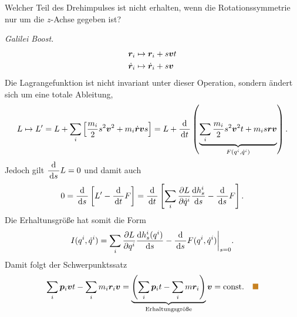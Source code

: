 \begin{bemn}[Übungsaufgabe:]
Welcher Teil des Drehimpulses ist nicht erhalten, wenn die
Rotationssymmetrie nur um die $z$-Achse gegeben ist?
\end{bemn}
\begin{bsp}
\textit{Galilei Boost.}
\begin{align*}
&\bm{r}_i \mapsto \bm{r}_i + s\bm{v}t\\
&\dot{\bm{r}}_i \mapsto \dot{\bm{r}}_i + s\bm{v}
\end{align*}
Die Lagrangefunktion ist nicht invariant unter dieser Operation, sondern ändert
sich um eine totale Ableitung,
\begin{align*}
L\mapsto L'=L + \sum_i\left[\frac{m_i}{2}s^2\bm{v}^2 + m_i\dot{\bm{r}} \bm{v}s
\right]= L + \frac{\mathrm{d}}{\,\mathrm{d} t\,}
\left(\underbrace{\sum_i \frac{m_i}{2}s^2\bm{v}^2t + m_i
s\bm{r}\bm{v}}_{F(q^i,\dot{q}^i)}\right).
\end{align*}
Jedoch gilt $\dfrac{\mathrm{d}}{\,\mathrm{d} s\,}L = 0$ und damit auch
\begin{align*}
0 = \dfrac{\mathrm{d}}{\,\mathrm{d} s\,}\left[L' - \frac{\mathrm{d}}{\,\mathrm{d} t\,}F\right]
= \dfrac{\mathrm{d}}{\,\mathrm{d} t\,}\left[\sum_i\frac{\partial L}{\partial
\dot{q}^i}\frac{\mathrm{d} h_s^i}{\,\mathrm{d} s\,} - \frac{\mathrm{d}}{\,\mathrm{d} s\,}F\right].
\end{align*}
Die Erhaltunsgröße hat somit die Form
\begin{align*}
I(q^i,\dot{q}^i) = \sum_i \frac{\partial L}{\partial q^i}\frac{\mathrm{d}
h_s^i(q^i)}{\,\mathrm{d} s\,} - \frac{\mathrm{d}}{\,\mathrm{d} s\,} F(q^i,\dot{q}^i)\bigg|_{s=0}.
\end{align*}
Damit folgt der Schwerpunktssatz
\begin{align*}
\sum_i \vec{p}_i\vec{v}t - \sum_i m_i\vec{r}_i\vec{v} =
\underbrace{\left(\sum_i \vec{p}_i t - \sum_i
m\vec{r}_i\right)}_{\text{Erhaltungsgröße}}\vec{v} = \const.\bsphere
\end{align*}
\end{bsp}

